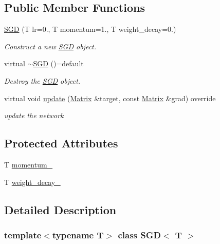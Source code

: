 \subsection*{Public Member Functions}
\begin{DoxyCompactItemize}
\item 
\mbox{\hyperlink{class_s_g_d_ab5164133117de1bdba4c735dfa535749}{S\+GD}} (T lr=0., T momentum=1., T weight\+\_\+decay=0.)
\begin{DoxyCompactList}\small\item\em Construct a new \mbox{\hyperlink{class_s_g_d}{S\+GD}} object. \end{DoxyCompactList}\item 
virtual \mbox{\hyperlink{class_s_g_d_a67a8d9c380b94c86158ab1709b752e1a}{$\sim$\+S\+GD}} ()=default
\begin{DoxyCompactList}\small\item\em Destroy the \mbox{\hyperlink{class_s_g_d}{S\+GD}} object. \end{DoxyCompactList}\item 
virtual void \mbox{\hyperlink{class_s_g_d_a0345cfa977a251c576096ea6a098230f}{update}} (\mbox{\hyperlink{class_s_g_d_a0c157dbad2dc900c00b9ca57f23ba676}{Matrix}} \&target, const \mbox{\hyperlink{class_s_g_d_a0c157dbad2dc900c00b9ca57f23ba676}{Matrix}} \&grad) override
\begin{DoxyCompactList}\small\item\em update the network \end{DoxyCompactList}\end{DoxyCompactItemize}
\subsection*{Protected Attributes}
\begin{DoxyCompactItemize}
\item 
T \mbox{\hyperlink{class_s_g_d_abc4dc58d224e921bc278508f5edfe1bd}{momentum\+\_\+}}
\item 
T \mbox{\hyperlink{class_s_g_d_ae34e45e15ff22ca62ee0d61104da2ff7}{weight\+\_\+decay\+\_\+}}
\end{DoxyCompactItemize}


\subsection{Detailed Description}
\subsubsection*{template$<$typename T$>$\newline
class S\+G\+D$<$ T $>$}

